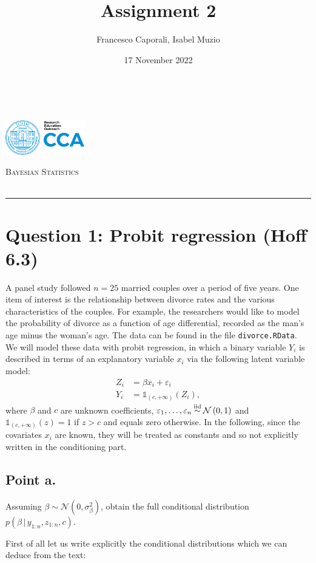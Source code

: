 \documentclass[
  11pt,
]{article}
\title{Assignment 2}
\author{Francesco Caporali, Isabel Muzio}
\date{17 November 2022}
\makeatletter
\def\maketitle{%
            \pagestyle{plain}
            \begin{flushleft}
                \textsc{\small{%
                    \@author \\
                    \@date
                }}
            \end{flushleft}
            \begin{flushright}\vspace{-15mm}
            \includegraphics[height = 1.5cm]{./files/cca.png}
            \end{flushright}
            \begin{center}\vspace{-5mm}
                \scshape{\LARGE{\scshape{Bayesian Statistics}} \\
                \normalsize \@title} \\
                \rule{0.75\linewidth}{0.1mm}
            \end{center}
            }
\makeatother
\begin{document}
\maketitle

\hypertarget{question-1-probit-regression-hoff-6.3}{%
\section{Question 1: Probit regression (Hoff
6.3)}\label{question-1-probit-regression-hoff-6.3}}

A panel study followed \(n = 25\) married couples over a period of five
years. One item of interest is the relationship between divorce rates
and the various characteristics of the couples. For example, the
researchers would like to model the probability of divorce as a function
of age differential, recorded as the man's age minus the woman's age.
The data can be found in the file \texttt{divorce.RData}. We will model
these data with probit regression, in which a binary variable \(Y_i\) is
described in terms of an explanatory variable \(x_i\) via the following
latent variable model: \begin{align*}
    Z_i & = \beta x_i + \varepsilon_i \\
    Y_i & = \mathds{1}_{(c, +\infty)}(Z_i),
\end{align*} where \(\beta\) and \(c\) are unknown coefficients,
\(\varepsilon_1, \dots, \varepsilon_n \stackrel{\mathclap{\normalfont\mbox{\scriptsize{iid}}}}{\sim}\mathcal{N}\left(0,1\right)\)
and \(\mathds{1}_{(c, +\infty)}(z) = 1\) if \(z > c\) and equals zero
otherwise. In the following, since the covariates \(x_i\) are known,
they will be treated as constants and so not explicitly written in the
conditioning part.

\hypertarget{point-a.}{%
\subsection{Point a.}\label{point-a.}}

Assuming \(\beta \sim \mathcal{N}\left(0,\sigma_\beta^2\right)\), obtain
the full conditional distribution \(p(\beta \,|\,y_{1:n}, z_{1:n}, c)\).

\medskip

First of all let us write explicitly the conditional distributions which
we can deduce from the text:
\end{document}
